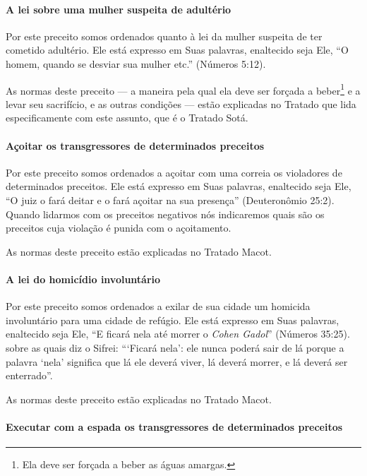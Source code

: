 \paragraph{A lei sobre uma mulher suspeita de adultério}

Por este preceito somos ordenados quanto à lei da mulher suspeita de ter
cometido adultério. Ele está expresso em Suas palavras, enaltecido seja Ele,
``O homem, quando se desviar sua mulher etc.'' (Números 5:12).

As normas deste preceito --- a maneira pela qual ela deve ser forçada a
beber\footnote{Ela deve ser forçada a beber as águas amargas.} e a levar seu sacrifício, e as outras
condições --- estão explicadas no Tratado que lida especificamente com
este assunto, que é o Tratado Sotá.

\paragraph{Açoitar os transgressores de determinados preceitos}

Por este preceito somos ordenados a açoitar com uma correia os
violadores de determinados preceitos. Ele está expresso em Suas
palavras, enaltecido seja Ele, ``O juiz o fará deitar e o fará açoitar
na sua presença'' (Deuteronômio 25:2). Quando lidarmos com os preceitos
negativos nós indicaremos quais são os preceitos cuja violação é punida
com o açoitamento.

As normas deste preceito estão explicadas no Tratado Macot.

\paragraph{A lei do homicídio involuntário}

Por este preceito somos ordenados a exilar de sua cidade um homicida
involuntário para uma cidade de refúgio. Ele está expresso em Suas
palavras, enaltecido seja Ele, ``E ficará nela até morrer o \textit{Cohen
Gadol}'' (Números 35:25). sobre as quais diz o Sifrei: ```Ficará nela':
ele nunca poderá sair de lá porque a palavra `nela' significa que lá ele
deverá viver, lá deverá morrer, e lá deverá ser enterrado''.

As normas deste preceito estão explicadas no Tratado Macot.

\paragraph{Executar com a espada os transgressores de determinados preceitos}

